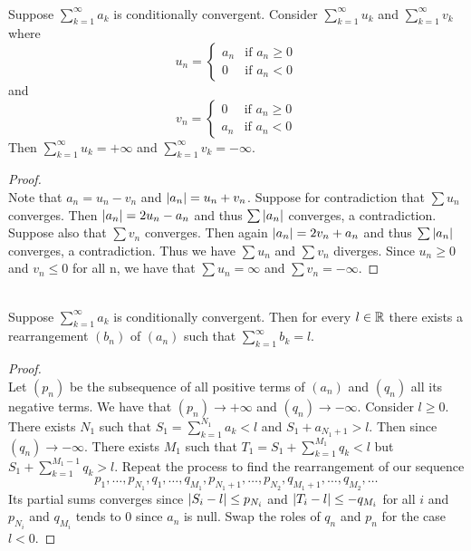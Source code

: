 \documentclass[a4paper]{article}
\begin{document}
\begin{thm}{}{}\\ Suppose $\sum_{k=1}^{\infty}a_k$ is conditionally convergent. Consider $\sum_{k=1}^{\infty}u_k$ and $\sum_{k=1}^{\infty}v_k$ where $$u_n=\begin{cases}
a_n & \text{if $a_n\geq0$} \\
0 & \text{if $a_n<0$}
\end{cases}$$
and
$$v_n=\begin{cases}
0 & \text{if $a_n\geq0$} \\
a_n & \text{if $a_n<0$}
\end{cases}$$
Then $\sum_{k=1}^{\infty}u_k=+\infty$ and $\sum_{k=1}^{\infty}v_k=-\infty$. 
\begin{proof}\\
Note that $a_n=u_n-v_n$ and $\abs{a_n}=u_n+v_n$. Suppose for contradiction that $\sum u_n$ converges. Then $\abs{a_n}=2u_n-a_n$ and thus $\sum\abs{a_n}$ converges, a contradiction. Suppose also that $\sum v_n$ converges. Then again $\abs{a_n}=2v_n+a_n$ and thus $\sum\abs{a_n}$ converges, a contradiction. Thus we have $\sum u_n$ and $\sum v_n$ diverges. Since $u_n\geq 0$ and $v_n\leq 0$ for all n, we have that $\sum u_n=\infty$ and $\sum v_n=-\infty$. 
\end{proof}
\end{thm}

\begin{thm}{}{}\\ Suppose $\sum_{k=1}^{\infty}a_k$ is conditionally convergent. Then for every $l\in\mathbb{R}$ there exists a rearrangement $(b_n)$ of $(a_n)$ such that $\sum_{k=1}^{\infty}b_k=l$. 
\begin{proof}\\
Let $(p_n)$ be the subsequence of all positive terms of $(a_n)$ and $(q_n)$ all its negative terms. We have that $(p_n)\to+\infty$ and $(q_n)\to-\infty$. Consider $l\geq0$. There exists $N_1$ such that $S_1=\sum_{k=1}^{N_1}a_k<l$ and $S_1+a_{N_1+1}>l$. Then since $(q_n)\to-\infty$. There exists $M_1$ such that $T_1=S_1+\sum_{k=1}^{M_1}q_k<l$ but $S_1+\sum_{k=1}^{M_1-1}q_k>l$. Repeat the process to find the rearrangement of our sequence $$p_1,\dots,p_{N_1},q_1,\dots,q_{M_1},p_{N_1+1},\dots,p_{N_2},q_{M_1+1},\dots,q_{M_2},\dots$$
Its partial sums converges since $\abs{S_i-l}\leq p_{N_i}$ and $\abs{T_i-l}\leq -q_{M_i}$ for all $i$ and $p_{N_i}$ and $q_{M_i}$ tends to $0$ since $a_n$ is null. Swap the roles of $q_n$ and $p_n$ for the case $l<0$. 
\end{proof}
\end{thm}
\end{document}
